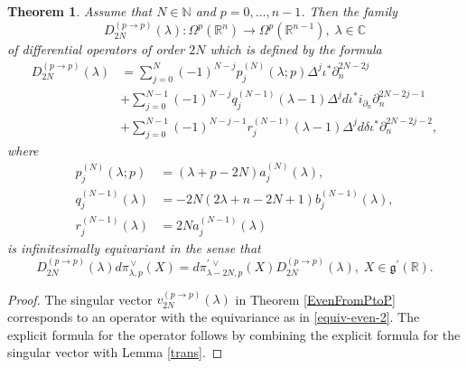 \documentclass[a4paper,12pt,reqno]{amsart}
\newtheorem{theorem}{Theorem}
\numberwithin{theorem}{subsection}
\numberwithin{equation}{section}
\begin{document}
\begin{theorem}\label{EvenDiffOp-type1} Assume that $N\in{\mathbb{N}}$ and $p=0,\dots,n-1$. Then the family
\begin{equation*}
   D_{2N}^{(p \to p)}(\lambda): \Omega^p({\mathbb{R}}^n) \to \Omega^{p}({\mathbb{R}}^{n-1}), \; \lambda \in {\mathbb{C}}
\end{equation*}
of differential operators of order $2N$ which is defined by the formula
\begin{align}
   D^{(p \to p)}_{2N}(\lambda)
   & = \sum_{j=0}^N(-1)^{N-j} p_j^{(N)}(\lambda;p)\Delta^j \iota^*\partial_n^{2N-2j} \nonumber\\
   & + \sum_{j=0}^{N-1} (-1)^{N-j} q_j^{(N-1)}(\lambda\!-\!1) \Delta^j {d} \iota^*i_{\partial_n}
   \partial_n^{2N-2j-1} \nonumber\\
   & + \sum_{j=0}^{N-1} (-1)^{N-j-1} r_j^{(N-1)}(\lambda\!-\!1) \Delta^j {d}
   \delta \iota^*\partial_n^{2N-2j-2},
\end{align}
where
\begin{align*}
   p_j^{(N)}(\lambda;p) & = (\lambda\!+\!p\!-\!2N) a_j^{(N)}(\lambda), \\
   q_j^{(N-1)}(\lambda) & = -2N(2\lambda\!+\!n\!-\!2N\!+\!1) b_j^{(N-1)}(\lambda), \\
   r_j^{(N-1)}(\lambda) & = 2N  a_j^{(N-1)}(\lambda)
\end{align*}
is infinitesimally equivariant in the sense that
\begin{equation}\label{equiv-even-2}
   D^{(p \to p)}_{2N}(\lambda) {d}\pi^{{\,\vee}}_{\lambda,p}(X)
   = {d}\pi^{\prime {{\,\vee}}}_{\lambda-2N,p}(X) D^{(p\to p)}_{2N}(\lambda), \;X \in
   {{\mathfrak g}}^{\prime}({\mathbb{R}}).
\end{equation}
\end{theorem}

\begin{proof} The singular vector $v^{(p\to p)}_{2N}(\lambda)$ in Theorem \ref{EvenFromPtoP}
corresponds to an operator with the equivariance as in \eqref{equiv-even-2}.
The explicit formula for the operator follows by combining the explicit formula
for the singular vector with Lemma \ref{trans}.
\end{proof}
\end{document}
